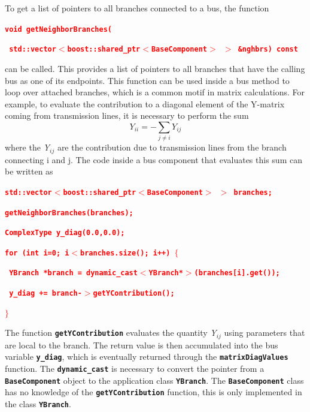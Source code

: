 \documentclass[12pt]{report} %
\begin{document}
To get a list of pointers to all branches connected to a bus, the function

\textcolor{red}{\texttt{\textbf{void getNeighborBranches(}}}

\textcolor{red}{\texttt{\textbf{   std::vector$\boldsymbol{\mathrm{<}}$boost::shared\_ptr$\boldsymbol{\mathrm{<}}$BaseComponent$\boldsymbol{\mathrm{>}}$ $\boldsymbol{\mathrm{>}}$ \&nghbrs) const}}}

can be called. This provides a list of pointers to all branches that have the calling bus as one of its endpoints. This function can be used inside a bus method to loop over attached branches, which is a common motif in matrix calculations. For example, to evaluate the contribution to a diagonal element of the Y-matrix coming from transmission lines, it is necessary to perform the sum\[Y_{ii}=-\sum_{j\neq i}{Y_{ij}}\] 
where the \textit{Y${}_{ij}$ }are the contribution due to transmission lines from the branch connecting i and j. The code inside a bus component that evaluates this sum can be written as

\textcolor{red}{\texttt{\textbf{std::vector$\boldsymbol{\mathrm{<}}$boost::shared\_ptr$\boldsymbol{\mathrm{<}}$BaseComponent$\boldsymbol{\mathrm{>}}$ $\boldsymbol{\mathrm{>}}$ branches;}}}

\textcolor{red}{\texttt{\textbf{getNeighborBranches(branches);}}}

\textcolor{red}{\texttt{\textbf{ComplexType y\_diag(0.0,0.0);}}}

\textcolor{red}{\texttt{\textbf{for (int i=0; i$\boldsymbol{\mathrm{<}}$branches.size(); i++) $\boldsymbol{\mathrm{\{}}$}}}

\textcolor{red}{\texttt{\textbf{  YBranch *branch = dynamic\_cast$\boldsymbol{\mathrm{<}}$YBranch*$\boldsymbol{\mathrm{>}}$(branches[i].get());}}}

\textcolor{red}{\texttt{\textbf{  y\_diag += branch-$\boldsymbol{\mathrm{>}}$getYContribution();}}}

\textcolor{red}{\texttt{\textbf{$\boldsymbol{\mathrm{\}}}$}}}

The function \texttt{\textbf{getYContribution}} evaluates the quantity \textit{Y${}_{ij}$ }using parameters that are local to the branch. The return value is then accumulated into the bus variable \texttt{\textbf{y\_diag}}, which is eventually returned through the \texttt{\textbf{matrixDiagValues}} function. The \texttt{\textbf{dynamic\_cast}} is necessary to convert the pointer from a \texttt{\textbf{BaseComponent}} object to the application class \texttt{\textbf{YBranch}}. The \texttt{\textbf{BaseComponent}} class has no knowledge of the \texttt{\textbf{getYContribution}} function, this is only implemented in the class \texttt{\textbf{YBranch}}.
\end{document}
